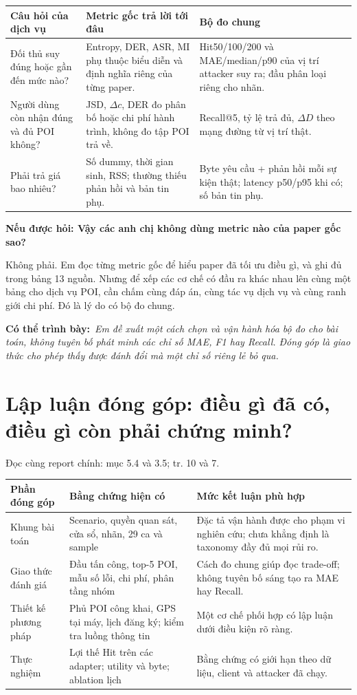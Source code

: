 \documentclass[10pt,a4paper]{article}
\newcommand{\say}[1]{\par\textbf{Có thể trình bày:}\ \textit{#1}\par}
\newcommand{\ask}[2]{\par\textbf{Nếu được hỏi: #1}\par #2\par}
\newcommand{\where}[1]{\par{\small\color{gray}Đọc cùng report chính: #1.}\par}
\newcommand{\guidepage}[1]{\clearpage\section{#1}}
\begin{document}
\begin{longtable}{@{}P{4.4cm}P{5.9cm}P{5.9cm}@{}}
\toprule Câu hỏi của dịch vụ & Metric gốc trả lời tới đâu & Bộ đo chung\\\midrule
Đối thủ suy đúng hoặc gần đến mức nào? & Entropy, DER, ASR, MI phụ thuộc biểu diễn và định nghĩa riêng của từng paper. & Hit50/100/200 và MAE/median/p90 của vị trí attacker suy ra; đầu phân loại riêng cho nhãn.\\[4pt]
Người dùng còn nhận đúng và đủ POI không? & JSD, $\Delta c$, DER đo phân bố hoặc chi phí hành trình, không đo tập POI trả về. & Recall@5, tỷ lệ trả đủ, $\Delta D$ theo mạng đường từ vị trí thật.\\[4pt]
Phải trả giá bao nhiêu? & Số dummy, thời gian sinh, RSS; thường thiếu phản hồi và bản tin phụ. & Byte yêu cầu + phản hồi mỗi sự kiện thật; latency p50/p95 khi có; số bản tin phụ.\\
\bottomrule
\end{longtable}

\ask{Vậy các anh chị không dùng metric nào của paper gốc sao?}{Không phải. Em đọc từng metric gốc để hiểu paper đã tối ưu điều gì, và ghi đủ trong bảng 13 nguồn. Nhưng để xếp các cơ chế có đầu ra khác nhau lên cùng một bảng cho dịch vụ POI, cần chấm cùng đáp án, cùng tác vụ dịch vụ và cùng ranh giới chi phí. Đó là lý do có bộ đo chung.}
\say{Em đề xuất một cách chọn và vận hành hóa bộ đo cho bài toán, không tuyên bố phát minh các chỉ số MAE, F1 hay Recall. Đóng góp là giao thức cho phép thấy được đánh đổi mà một chỉ số riêng lẻ bỏ qua.}

\guidepage{Lập luận đóng góp: điều gì đã có, điều gì còn phải chứng minh?}
\where{mục 5.4 và 3.5; tr. 10 và 7}
\begin{longtable}{@{}P{3.8cm}P{6.0cm}P{6.4cm}@{}}
\toprule Phần đóng góp & Bằng chứng hiện có & Mức kết luận phù hợp\\\midrule
Khung bài toán & Scenario, quyền quan sát, cửa sổ, nhãn, 29 ca và sample & Đặc tả vận hành được cho phạm vi nghiên cứu; chưa khẳng định là taxonomy đầy đủ mọi rủi ro.\\[5pt]
Giao thức đánh giá & Đầu tấn công, top-5 POI, mẫu số lỗi, chi phí, phân tầng nhóm & Cách đo chung giúp đọc trade-off; không tuyên bố sáng tạo ra MAE hay Recall.\\[5pt]
Thiết kế phương pháp & Phủ POI công khai, GPS tại máy, lịch đăng ký; kiểm tra luồng thông tin & Một cơ chế phối hợp có lập luận dưới điều kiện rõ ràng.\\[5pt]
Thực nghiệm & Lợi thế Hit trên các adapter; utility và byte; ablation lịch & Bằng chứng có giới hạn theo dữ liệu, client và attacker đã chạy.\\
\bottomrule
\end{longtable}
\end{document}
